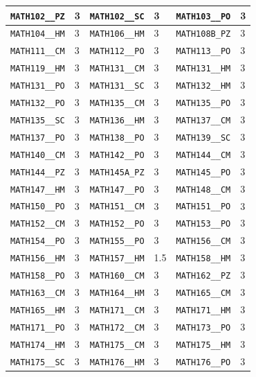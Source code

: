 \begin{longtable}{|l|l||l|l||l|l|}
    \verb|MATH102__PZ| & 3 & \verb|MATH102__SC| & 3 & \verb|MATH103__PO| & 3\\\hline
    \verb|MATH104__HM| & 3 & \verb|MATH106__HM| & 3 & \verb|MATH108B_PZ| & 3\\\hline
    \verb|MATH111__CM| & 3 & \verb|MATH112__PO| & 3 & \verb|MATH113__PO| & 3\\\hline
    \verb|MATH119__HM| & 3 & \verb|MATH131__CM| & 3 & \verb|MATH131__HM| & 3\\\hline
    \verb|MATH131__PO| & 3 & \verb|MATH131__SC| & 3 & \verb|MATH132__HM| & 3\\\hline
    \verb|MATH132__PO| & 3 & \verb|MATH135__CM| & 3 & \verb|MATH135__PO| & 3\\\hline
    \verb|MATH135__SC| & 3 & \verb|MATH136__HM| & 3 & \verb|MATH137__CM| & 3\\\hline
    \verb|MATH137__PO| & 3 & \verb|MATH138__PO| & 3 & \verb|MATH139__SC| & 3\\\hline
    \verb|MATH140__CM| & 3 & \verb|MATH142__PO| & 3 & \verb|MATH144__CM| & 3\\\hline
    \verb|MATH144__PZ| & 3 & \verb|MATH145A_PZ| & 3 & \verb|MATH145__PO| & 3\\\hline
    \verb|MATH147__HM| & 3 & \verb|MATH147__PO| & 3 & \verb|MATH148__CM| & 3\\\hline
    \verb|MATH150__PO| & 3 & \verb|MATH151__CM| & 3 & \verb|MATH151__PO| & 3\\\hline
    \verb|MATH152__CM| & 3 & \verb|MATH152__PO| & 3 & \verb|MATH153__PO| & 3\\\hline
    \verb|MATH154__PO| & 3 & \verb|MATH155__PO| & 3 & \verb|MATH156__CM| & 3\\\hline
    \verb|MATH156__HM| & 3 & \verb|MATH157__HM| & 1.5 & \verb|MATH158__HM| & 3\\\hline
    \verb|MATH158__PO| & 3 & \verb|MATH160__CM| & 3 & \verb|MATH162__PZ| & 3\\\hline
    \verb|MATH163__CM| & 3 & \verb|MATH164__HM| & 3 & \verb|MATH165__CM| & 3\\\hline
    \verb|MATH165__HM| & 3 & \verb|MATH171__CM| & 3 & \verb|MATH171__HM| & 3\\\hline
    \verb|MATH171__PO| & 3 & \verb|MATH172__CM| & 3 & \verb|MATH173__PO| & 3\\\hline
    \verb|MATH174__HM| & 3 & \verb|MATH175__CM| & 3 & \verb|MATH175__HM| & 3\\\hline
    \verb|MATH175__SC| & 3 & \verb|MATH176__HM| & 3 & \verb|MATH176__PO| & 3\\\hline

\end{longtable}
